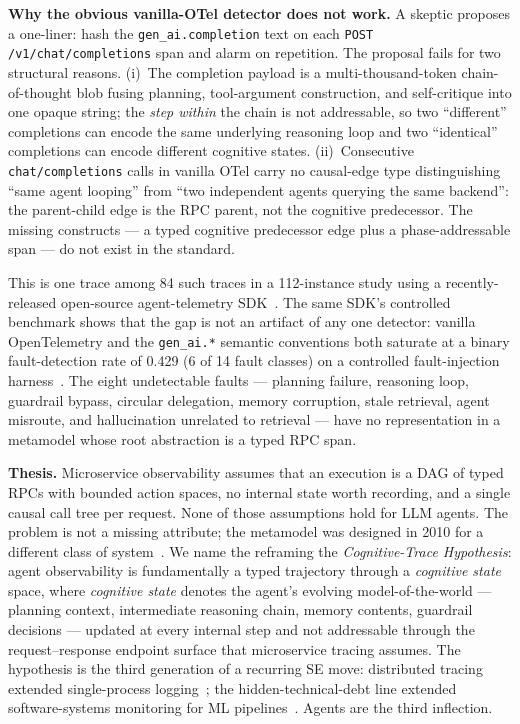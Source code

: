 \documentclass[10pt,conference]{IEEEtran}
\begin{document}
\textbf{Why the obvious vanilla-OTel detector does not work.}
A skeptic proposes a one-liner: hash the \texttt{gen\_ai.completion}
text on each \texttt{POST /v1/chat/com\-ple\-tions} span and alarm on
repetition. The proposal fails for two structural reasons. (i)~The
completion payload is a multi-thousand-token chain-of-thought blob
fusing planning, tool-argument construction, and self-critique into one
opaque string; the \emph{step within} the chain is not addressable, so
two ``different'' completions can encode the same underlying reasoning
loop and two ``identical'' completions can encode different cognitive
states. (ii)~Consecutive \texttt{chat/completions} calls in vanilla
OTel carry no causal-edge type distinguishing ``same agent looping''
from ``two independent agents querying the same backend'': the
parent-child edge is the RPC parent, not the cognitive predecessor.
The missing constructs --- a typed cognitive predecessor edge plus a
phase-addressable span --- do not exist in the standard.

This is one trace among 84 such traces in a 112-instance study using a
recently-released open-source agent-telemetry SDK~\cite{anon_sdk_2026}.
The same SDK's controlled benchmark shows that the gap is not an
artifact of any one detector: vanilla OpenTelemetry and the
\texttt{gen\_ai.*} semantic conventions both saturate at a binary
fault-detection rate of 0.429 (6 of 14 fault classes) on a controlled
fault-injection harness~\cite{anon_taxonomy_2026}. The eight
undetectable faults --- planning failure, reasoning loop, guardrail
bypass, circular delegation, memory corruption, stale retrieval, agent
misroute, and hallucination unrelated to retrieval --- have no
representation in a metamodel whose root abstraction is a typed RPC
span.

\textbf{Thesis.}
Microservice observability assumes that an execution is a DAG of typed
RPCs with bounded action spaces, no internal state worth recording, and
a single causal call tree per request. None of those assumptions hold
for LLM agents. The problem is not a missing attribute; the metamodel
was designed in 2010 for a different class of
system~\cite{dapper,tracing_practice}. We name the reframing the
\emph{Cognitive-Trace Hypothesis}: agent observability is fundamentally
a typed trajectory through a \emph{cognitive state} space, where
\emph{cognitive state} denotes the agent's evolving model-of-the-world
--- planning context, intermediate reasoning chain, memory contents,
guardrail decisions --- updated at every internal step and not
addressable through the request--response endpoint surface that
microservice tracing assumes. The hypothesis is the third generation of
a recurring SE move: distributed tracing extended single-process
logging~\cite{dapper}; the hidden-technical-debt line extended
software-systems monitoring for ML
pipelines~\cite{sculley_tech_debt,breck_ml_test_score}. Agents are the
third inflection.
\end{document}
